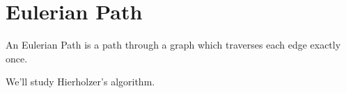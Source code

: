  
\section{Eulerian Path}
An Eulerian Path is a path through a graph which traverses each edge exactly once.

We'll study Hierholzer's algorithm.

